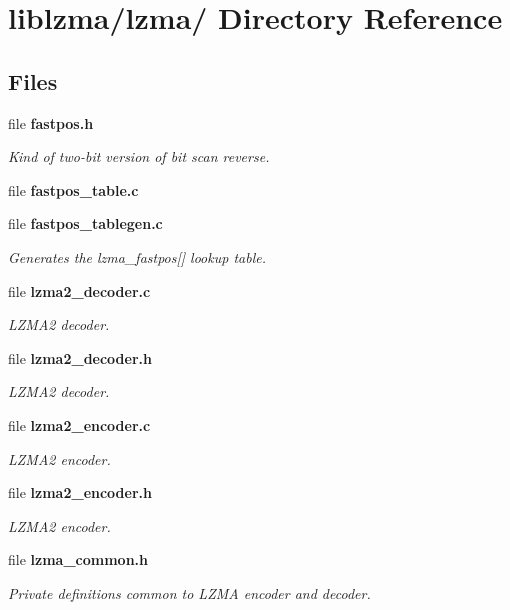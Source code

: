 \section{liblzma/lzma/ Directory Reference}
\label{dir_ac7229a575da173bd8a390f0921c5810}
\subsection*{Files}
\begin{DoxyCompactItemize}
\item 
file {\bf fastpos.\-h}
\begin{DoxyCompactList}\small\item\em Kind of two-\/bit version of bit scan reverse. \end{DoxyCompactList}\item 
file {\bfseries fastpos\-\_\-table.\-c}
\item 
file {\bf fastpos\-\_\-tablegen.\-c}
\begin{DoxyCompactList}\small\item\em Generates the lzma\-\_\-fastpos[] lookup table. \end{DoxyCompactList}\item 
file {\bf lzma2\-\_\-decoder.\-c}
\begin{DoxyCompactList}\small\item\em L\-Z\-M\-A2 decoder. \end{DoxyCompactList}\item 
file {\bf lzma2\-\_\-decoder.\-h}
\begin{DoxyCompactList}\small\item\em L\-Z\-M\-A2 decoder. \end{DoxyCompactList}\item 
file {\bf lzma2\-\_\-encoder.\-c}
\begin{DoxyCompactList}\small\item\em L\-Z\-M\-A2 encoder. \end{DoxyCompactList}\item 
file {\bf lzma2\-\_\-encoder.\-h}
\begin{DoxyCompactList}\small\item\em L\-Z\-M\-A2 encoder. \end{DoxyCompactList}\item 
file {\bf lzma\-\_\-common.\-h}
\begin{DoxyCompactList}\small\item\em Private definitions common to L\-Z\-M\-A encoder and decoder. \end{DoxyCompactList}\item 

\end{DoxyCompactItemize}
